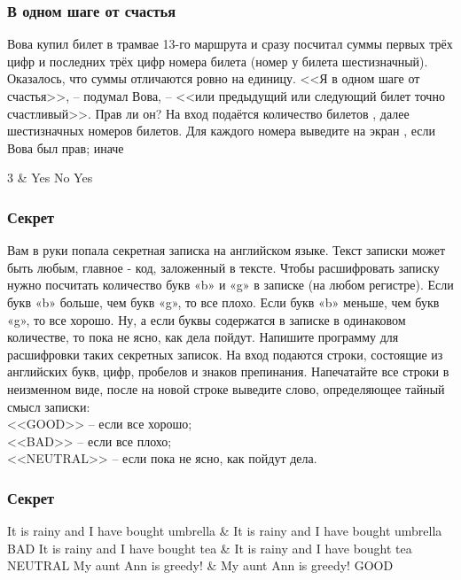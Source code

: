 \begin{frame}
	\frametitle{В одном шаге от счастья}
 Вова купил билет в трамвае 13-го маршрута и сразу посчитал суммы первых трёх
	цифр и последних трёх цифр номера билета (номер у билета шестизначный).
	Оказалось, что суммы отличаются ровно на единицу. <<Я в одном шаге от
	счастья>>, -- подумал Вова, -- <<или предыдущий или следующий билет точно
	счастливый>>. Прав ли он?
	\inp
	На вход подаётся количество билетов , далее  шестизначных
	номеров билетов.
	\out
	Для каждого номера выведите на экран , если Вова был прав; иначе
	\begin{ex}
		3    & Yes \newline No \newline Yes \tb
	\end{ex}
\end{frame}

\begin{frame}
	\frametitle{Секрет}
 Вам в руки попала секретная записка на английском языке. Текст записки может
	быть любым, главное - код, заложенный в тексте. Чтобы расшифровать записку
	нужно посчитать количество букв «b» и «g» в записке (на любом регистре).  Если
	букв «b» больше, чем букв «g», то все плохо. Если букв «b» меньше, чем букв
	«g», то все хорошо. Ну, а если буквы содержатся в записке в одинаковом
	количестве, то пока не ясно, как дела пойдут. Напишите программу для
	расшифровки таких секретных записок.
	\inp
	На вход подаются строки, состоящие из английских букв, цифр, пробелов и знаков
	препинания.
	\out
	Напечатайте все строки в неизменном виде, после на новой строке выведите
	слово, определяющее тайный смысл записки: \\
	<<GOOD>> -- если все хорошо; \\
	<<BAD>> -- если все плохо; \\
	<<NEUTRAL>> -- если пока не ясно, как пойдут дела.
\end{frame}

\begin{frame}
	\frametitle{Секрет}
	\leavevmode
	\begin{ex}
		It is rainy and I have bought umbrella & It is rainy and I have bought
		umbrella \newline BAD \tb
		It is rainy \newline and I have bought tea & It is rainy \newline and I
		have bought tea \newline NEUTRAL \tb
		My aunt Ann is greedy! & My aunt Ann is greedy! \newline GOOD \tb
	\end{ex}
\end{frame}

